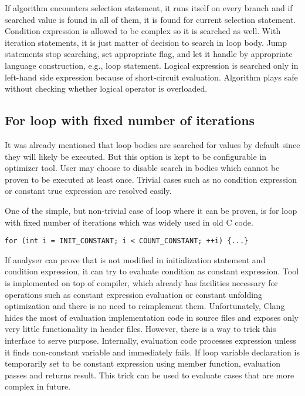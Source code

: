 If algorithm encounters selection statement, it runs itself on every branch and if searched value is found in all of them, it is found for current selection statement. Condition expression is allowed to be complex so it is searched as well. With iteration statements, it is just matter of decision to search in loop body. Jump statements stop searching, set appropriate flag, and let it handle by appropriate language construction, e.g., loop statement. Logical expression is searched only in left-hand side expression because of short-circuit evaluation. Algorithm plays safe without checking whether logical operator is overloaded.

\subsection{For loop with fixed number of iterations}
\label{prefetch-for}
It was already mentioned that loop bodies are searched for values by default since they will likely be executed. But this option is kept to be configurable in optimizer tool. User may choose to disable search in bodies which cannot be proven to be executed at least once. Trivial cases such as no condition expression or constant true expression are resolved easily.

One of the simple, but non-trivial case of loop where it can be proven, is for loop with fixed number of iterations which was widely used in old C code.

\begin{lstlisting}[caption={\code{for} loop with constant number of iterations.}]
for (int i = INIT_CONSTANT; i < COUNT_CONSTANT; ++i) {...}
\end{lstlisting}

If analyser can prove that  is not modified in initialization statement and condition expression, it can try to evaluate condition as constant expression. Tool is implemented on top of compiler, which already has facilities necessary for operations such as constant expression evaluation or constant unfolding optimization and there is no need to reimplement them. Unfortunately, Clang hides the most of evaluation implementation code in source files and exposes only very little functionality in header files. However, there is a way to trick this interface to serve purpose. Internally, evaluation code processes expression unless it finds non-constant variable and immediately fails. If loop variable declaration is temporarily set to be constant expression using  member function, evaluation passes and returns result. This trick can be used to evaluate cases that are more complex in future.

